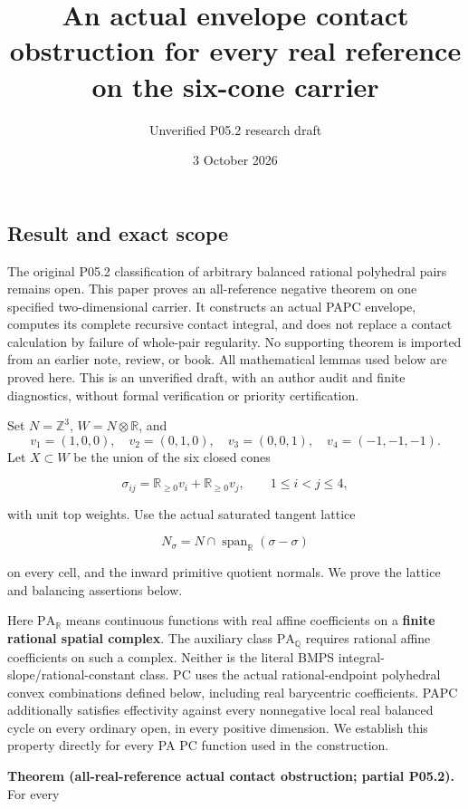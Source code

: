 \documentclass[
  10pt,
]{article}
\title{An actual envelope contact obstruction for every real reference
on the six-cone carrier}
\author{Unverified P05.2 research draft}
\date{3 October 2026}
\begin{document}
\maketitle

\subsection{Result and exact scope}\label{result-and-exact-scope}

The original P05.2 classification of arbitrary balanced rational
polyhedral pairs remains open. This paper proves an all-reference
negative theorem on one specified two-dimensional carrier. It constructs
an actual PAPC envelope, computes its complete recursive contact
integral, and does not replace a contact calculation by failure of
whole-pair regularity. No supporting theorem is imported from an earlier
note, review, or book. All mathematical lemmas used below are proved
here. This is an unverified draft, with an author audit and finite
diagnostics, without formal verification or priority certification.

Set \(N=\mathbb Z^3\), \(W=N\otimes\mathbb R\), and \[
v_1=(1,0,0),\quad v_2=(0,1,0),\quad v_3=(0,0,1),
\quad v_4=(-1,-1,-1).
\] Let \(X\subset W\) be the union of the six closed cones

\[
\sigma_{ij}=\mathbb R_{\geq0}v_i+\mathbb R_{\geq0}v_j,
\qquad 1\leq i<j\leq4,
\]

with unit top weights. Use the actual saturated tangent lattice

\[
N_\sigma=N\cap\operatorname{span}_{\mathbb R}(\sigma-\sigma)
\]

on every cell, and the inward primitive quotient normals. We prove the
lattice and balancing assertions below.

Here \(\mathrm{PA}_{\mathbb R}\) means continuous functions with real
affine coefficients on a \textbf{finite rational spatial complex}. The
auxiliary class \(\mathrm{PA}_{\mathbb Q}\) requires rational affine
coefficients on such a complex. Neither is the literal BMPS
integral-slope/rational-constant class. PC uses the actual
rational-endpoint polyhedral convex combinations defined below,
including real barycentric coefficients. PAPC additionally satisfies
effectivity against every nonnegative local real balanced cycle on every
ordinary open, in every positive dimension. We establish this property
directly for every PA PC function used in the construction.

\textbf{Theorem (all-real-reference actual contact obstruction; partial
P05.2).} For every
\end{document}
